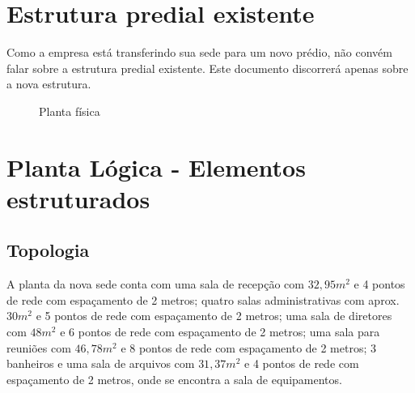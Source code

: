 \documentclass[	DIV=calc,%
paper=a4,%
fontsize=12pt,%
onecolumn]{scrartcl}	 					%
\begin{document}
	\section{Estrutura predial existente}
	Como a empresa está transferindo sua sede para um novo prédio, não convém falar sobre a estrutura predial existente. Este documento discorrerá apenas sobre a nova estrutura.
	\clearpage
	\recalctypearea
	
	\begin{figure}
		\noindent{}
		\caption{Planta física}
		\label{fig1}
	\end{figure}
	
	\clearpage
	\recalctypearea
	
	\section{Planta Lógica - Elementos estruturados}
	
	\subsection{Topologia}
	
		A planta da nova sede conta com uma sala de recepção com $ 32,95m^{2}  $ e 4 pontos de rede com espaçamento de 2 metros; quatro salas administrativas com aprox. $ 30m^{2}  $ e 5 pontos de rede com espaçamento de 2 metros; uma sala de diretores com $ 48m^{2}  $ e 6 pontos de rede com espaçamento de 2 metros; uma sala para reuniões com $ 46,78m^{2}  $ e 8 pontos de rede com espaçamento de 2 metros;  3 banheiros e uma sala de arquivos com $ 31,37m^{2}  $ e 4 pontos de rede com espaçamento de 2 metros, onde se encontra a sala de equipamentos.
		
\end{document}
